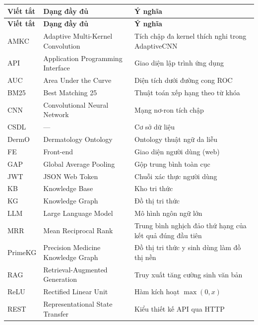
\begin{longtable}{|>{\raggedright\arraybackslash}p{0.17\dimexpr\linewidth-6\tabcolsep\relax}|>{\raggedright\arraybackslash}p{0.38\dimexpr\linewidth-6\tabcolsep\relax}|>{\raggedright\arraybackslash}p{0.45\dimexpr\linewidth-6\tabcolsep\relax}|}
\hline
\textbf{Viết tắt} & \textbf{Dạng đầy đủ} & \textbf{Ý nghĩa} \\ \hline
\endfirsthead
\hline
\textbf{Viết tắt} & \textbf{Dạng đầy đủ} & \textbf{Ý nghĩa} \\ \hline
\endhead
AMKC & Adaptive Multi-Kernel Convolution & Tích chập đa kernel thích nghi trong AdaptiveCNN \\ \hline
API & Application Programming Interface & Giao diện lập trình ứng dụng \\ \hline
AUC & Area Under the Curve & Diện tích dưới đường cong ROC \\ \hline
BM25 & Best Matching 25 & Thuật toán xếp hạng theo từ khóa \\ \hline
CNN & Convolutional Neural Network & Mạng nơ-ron tích chập \\ \hline
CSDL & --- & Cơ sở dữ liệu \\ \hline
DermO & Dermatology Ontology & Ontology thuật ngữ da liễu \\ \hline
FE & Front-end & Giao diện người dùng (web) \\ \hline
GAP & Global Average Pooling & Gộp trung bình toàn cục \\ \hline
JWT & JSON Web Token & Chuỗi xác thực người dùng \\ \hline
KB & Knowledge Base & Kho tri thức \\ \hline
KG & Knowledge Graph & Đồ thị tri thức \\ \hline
LLM & Large Language Model & Mô hình ngôn ngữ lớn \\ \hline
MRR & Mean Reciprocal Rank & Trung bình nghịch đảo thứ hạng của kết quả đúng đầu tiên \\ \hline
PrimeKG & Precision Medicine Knowledge Graph & Đồ thị tri thức y sinh dùng làm đồ thị nền \\ \hline
RAG & Retrieval-Augmented Generation & Truy xuất tăng cường sinh văn bản \\ \hline
ReLU & Rectified Linear Unit & Hàm kích hoạt $\max(0,x)$ \\ \hline
REST & Representational State Transfer & Kiểu thiết kế API qua HTTP \\ \hline

\end{longtable}
